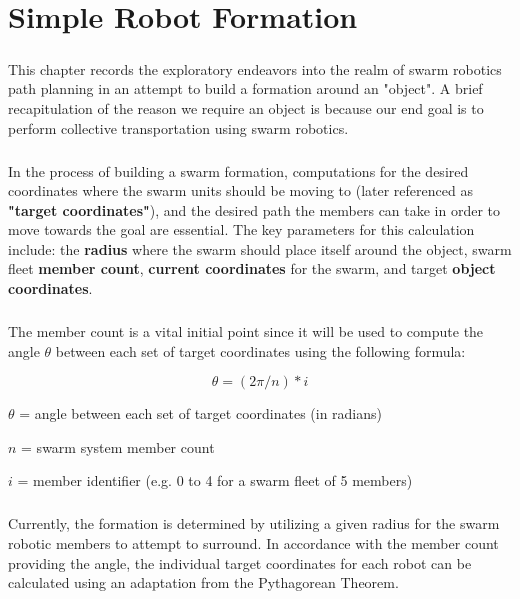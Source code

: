 \chapter{Simple Robot Formation}

\paragraph*{}
This chapter records the exploratory endeavors into the realm of swarm robotics path planning in an attempt to build a formation around an "object". A brief recapitulation of the reason we require an object is because our end goal is to perform collective transportation using swarm robotics.

\paragraph*{}
In the process of building a swarm formation, computations for the desired coordinates where the swarm units should be moving to (later referenced as \textbf{"target coordinates"}), and the desired path the members can take in order to move towards the goal are essential. The key parameters for this calculation include: the \textbf{radius} where the swarm should place itself around the object, swarm fleet \textbf{member count}, \textbf{current coordinates} for the swarm, and target \textbf{object coordinates}.

\paragraph*{}
The member count is a vital initial point since it will be used to compute the angle \(\theta\) between each set of target coordinates using the following formula:

\[\theta = (2\pi / n) * i\]

\begin{description}
    \item[where:]
    \item \(\theta\) = angle between each set of target coordinates (in radians)
    \item \(n\) = swarm system member count
    \item \(i\) = member identifier (e.g. 0 to 4 for a swarm fleet of 5 members)
\end{description}

\paragraph*{}
Currently, the formation is determined by utilizing a given radius for the swarm robotic members to attempt to surround. In accordance with the member count providing the angle, the individual target coordinates for each robot can be calculated using an adaptation from the Pythagorean Theorem. 

